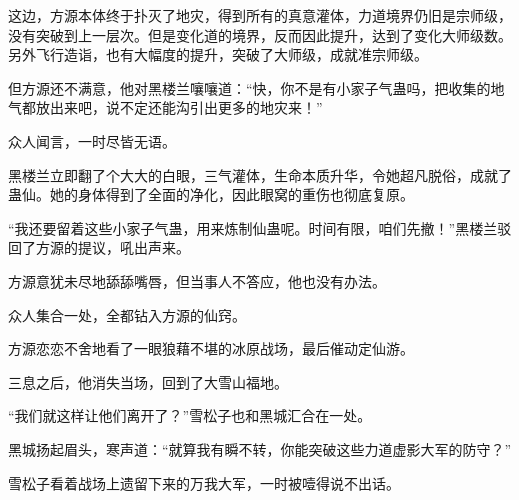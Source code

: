 \begin{this_body}
这边，方源本体终于扑灭了地灾，得到所有的真意灌体，力道境界仍旧是宗师级，没有突破到上一层次。但是变化道的境界，反而因此提升，达到了变化大师级数。另外飞行造诣，也有大幅度的提升，突破了大师级，成就准宗师级。

但方源还不满意，他对黑楼兰嚷嚷道：“快，你不是有小家子气蛊吗，把收集的地气都放出来吧，说不定还能沟引出更多的地灾来！”

众人闻言，一时尽皆无语。

黑楼兰立即翻了个大大的白眼，三气灌体，生命本质升华，令她超凡脱俗，成就了蛊仙。她的身体得到了全面的净化，因此眼窝的重伤也彻底复原。

“我还要留着这些小家子气蛊，用来炼制仙蛊呢。时间有限，咱们先撤！”黑楼兰驳回了方源的提议，吼出声来。

方源意犹未尽地舔舔嘴唇，但当事人不答应，他也没有办法。

众人集合一处，全都钻入方源的仙窍。

方源恋恋不舍地看了一眼狼藉不堪的冰原战场，最后催动定仙游。

三息之后，他消失当场，回到了大雪山福地。

“我们就这样让他们离开了？”雪松子也和黑城汇合在一处。

黑城扬起眉头，寒声道：“就算我有瞬不转，你能突破这些力道虚影大军的防守？”

雪松子看着战场上遗留下来的万我大军，一时被噎得说不出话。

\end{this_body}

